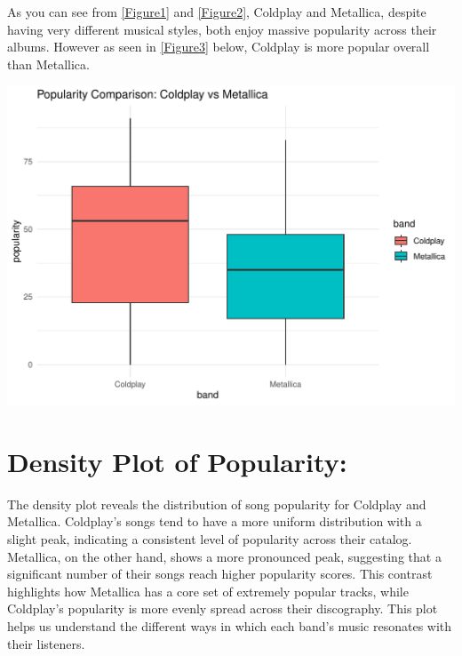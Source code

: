 \documentclass[12pt,preprint, authoryear]{elsarticle}
\let\origfigure\figure
\let\endorigfigure\endfigure
\renewenvironment{figure}[1][2] {
    \expandafter\origfigure\expandafter[H]
} {
    \endorigfigure
}
\numberwithin{equation}{section}
\numberwithin{figure}{section}
\numberwithin{table}{section}
\begin{document}
As you can see from \ref{Figure1} and \ref{Figure2}, Coldplay and
Metallica, despite having very different musical styles, both enjoy
massive popularity across their albums. However as seen in \ref{Figure3}
below, Coldplay is more popular overall than Metallica.

\begin{figure}

{\centering \includegraphics{README_files/figure-latex/unnamed-chunk-3-1} 

}

\caption{Comparing both of the Band's Popularity\label{Figure3}}\label{fig:unnamed-chunk-3}
\end{figure}

\hypertarget{density-plot-of-popularity}{%
\section{Density Plot of Popularity:}\label{density-plot-of-popularity}}

The density plot reveals the distribution of song popularity for
Coldplay and Metallica. Coldplay's songs tend to have a more uniform
distribution with a slight peak, indicating a consistent level of
popularity across their catalog. Metallica, on the other hand, shows a
more pronounced peak, suggesting that a significant number of their
songs reach higher popularity scores. This contrast highlights how
Metallica has a core set of extremely popular tracks, while Coldplay's
popularity is more evenly spread across their discography. This plot
helps us understand the different ways in which each band's music
resonates with their listeners.
\end{document}
